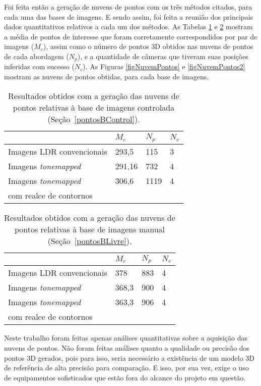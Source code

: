 Foi feita então a geração de nuvens de pontos com os três métodos citados, para cada uma das bases de imagens. E sendo assim, foi feita a reunião dos principais dados quantitativos relativos a cada um dos métodos. As Tabelas \ref{tabResultados} e \ref{tabResultados2} mostram a média de pontos de interesse que foram corretamente correspondidos por par de imagens ($M_c$), assim como o número de pontos 3D obtidos nas nuvens de pontos de cada abordagem ($N_p$), e a quantidade de câmeras que tiveram suas posições inferidas com sucesso ($N_c$). As Figuras \ref{figNuvemPontos} e \ref{figNuvemPontos2} mostram as nuvens de pontos obtidas, para cada base de imagens.

\begin{table}[H]
  \centering
  \caption{Resultados obtidos com a geração das nuvens de pontos relativas à base de imagens controlada (Seção~\protect\ref{pontosBControl}).}
  \label{tabResultados}
  \begin{tabular}{l|l|l|l}
    \hline
               & $M_c$ &  $N_p$ & $N_c$ \\
    \hline
    Imagens LDR convencionais & 293,5 & 115 & 3 \\
    \hline
    Imagens \textit{tonemapped} & 291,16 & 732 & 4 \\  
    \hline
    Imagens \textit{tonemapped} & 306,6 & 1119 & 4 \\
    com realce de contornos & & & \\  
    \hline
  \end{tabular}
\end{table}

\begin{table}[H]
  \centering
  \caption{Resultados obtidos com a geração das nuvens de pontos relativas à base de imagens manual (Seção~\protect\ref{pontosBLivre}).}
  \label{tabResultados2}
  \begin{tabular}{l|l|l|l}
    \hline
               & $M_c$ &  $N_p$ & $N_c$ \\
    \hline
    Imagens LDR convencionais & 378 & 883 & 4 \\
    \hline
    Imagens \textit{tonemapped} & 368,3 & 900 & 4 \\  
    \hline
    Imagens \textit{tonemapped} & 363,3 & 906 & 4 \\
    com realce de contornos & & & \\  
    \hline
  \end{tabular}
\end{table}

Neste trabalho foram feitas apenas análises quantitativas sobre a aquisição das nuvens de pontos. Não foram feitas análises quanto a qualidade ou precisão dos pontos 3D gerados, pois para isso, seria necessário a existência de um modelo 3D de referência de alta precisão para comparação. E isso, por sua vez, exige o uso de equipamentos sofisticados que estão fora do alcance do projeto em questão.

